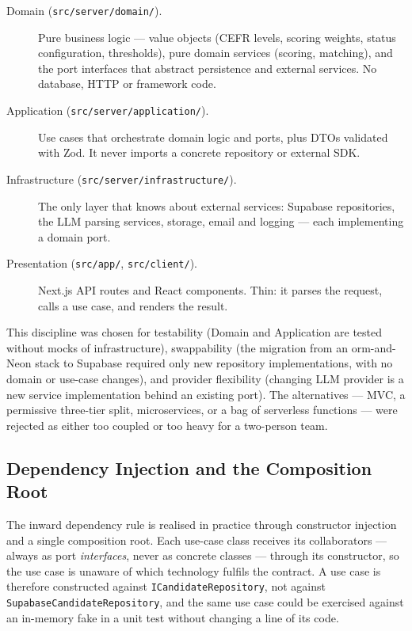 \begin{description}
	\item[Domain (\texttt{src/server/domain/}).] Pure business logic ---
	value objects (CEFR levels, scoring weights, status configuration,
	thresholds), pure domain services (scoring, matching), and the port
	interfaces that abstract persistence and external services. No
	database, HTTP or framework code.
	\item[Application (\texttt{src/server/application/}).] Use cases that
	orchestrate domain logic and ports, plus DTOs validated with Zod. It
	never imports a concrete repository or external SDK.
	\item[Infrastructure (\texttt{src/server/infrastructure/}).] The only
	layer that knows about external services: Supabase repositories, the
	LLM parsing services, storage, email and logging --- each implementing
	a domain port.
	\item[Presentation (\texttt{src/app/}, \texttt{src/client/}).] Next.js
	API routes and React components. Thin: it parses the request, calls a
	use case, and renders the result.
\end{description}

This discipline was chosen for testability (Domain and Application are
tested without mocks of infrastructure), swappability (the migration from an
\gls{orm}-and-Neon stack to Supabase required only new repository implementations,
with no domain or use-case changes), and provider flexibility (changing LLM
provider is a new service implementation behind an existing port). The
alternatives --- MVC, a permissive three-tier split, microservices, or a
bag of serverless functions --- were rejected as either too coupled or too
heavy for a two-person team.

\subsection{Dependency Injection and the Composition Root}
\label{sec:design-di}

The inward dependency rule is realised in practice through constructor
injection and a single composition root. Each use-case class receives its
collaborators --- always as port \emph{interfaces}, never as concrete classes
--- through its constructor, so the use case is unaware of which technology
fulfils the contract. A use case is therefore constructed against
\texttt{ICandidateRepository}, not against \texttt{SupabaseCandidateRepository},
and the same use case could be exercised against an in-memory fake in a unit
test without changing a line of its code.

